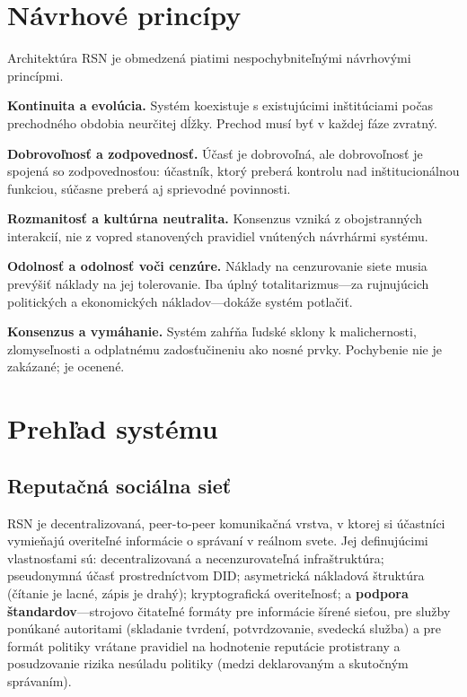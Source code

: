 \documentclass[11pt,a4paper,twocolumn]{article}
\begin{document}
\section{Návrhové princípy}

Architektúra RSN je obmedzená piatimi nespochybniteľnými návrhovými princípmi.

\textbf{Kontinuita a evolúcia.} Systém koexistuje s existujúcimi inštitúciami počas prechodného obdobia neurčitej dĺžky. Prechod musí byť v každej fáze zvratný.

\textbf{Dobrovoľnosť a zodpovednosť.} Účasť je dobrovoľná, ale dobrovoľnosť je spojená so zodpovednosťou: účastník, ktorý preberá kontrolu nad inštitucionálnou funkciou, súčasne preberá aj sprievodné povinnosti.

\textbf{Rozmanitosť a kultúrna neutralita.} Konsenzus vzniká z obojstranných interakcií, nie z vopred stanovených pravidiel vnútených návrhármi systému.

\textbf{Odolnosť a odolnosť voči cenzúre.} Náklady na cenzurovanie siete musia prevýšiť náklady na jej tolerovanie. Iba úplný totalitarizmus---za rujnujúcich politických a ekonomických nákladov---dokáže systém potlačiť.

\textbf{Konsenzus a vymáhanie.} Systém zahŕňa ľudské sklony k malichernosti, zlomyseľnosti a odplatnému zadosťučineniu ako nosné prvky. Pochybenie nie je zakázané; je ocenené.

\section{Prehľad systému}

\subsection{Reputačná sociálna sieť}

RSN je decentralizovaná, peer-to-peer komunikačná vrstva, v ktorej si účastníci vymieňajú overiteľné informácie o správaní v reálnom svete. Jej definujúcimi vlastnosťami sú: decentralizovaná a necenzurovateľná infraštruktúra; pseudonymná účasť prostredníctvom DID; asymetrická nákladová štruktúra (čítanie je lacné, zápis je drahý); kryptografická overiteľnosť; a \textbf{podpora štandardov}---strojovo čitateľné formáty pre informácie šírené sieťou, pre služby ponúkané autoritami (skladanie tvrdení, potvrdzovanie, svedecká služba) a pre formát politiky vrátane pravidiel na hodnotenie reputácie protistrany a posudzovanie rizika nesúladu politiky (medzi deklarovaným a skutočným správaním).
\end{document}
